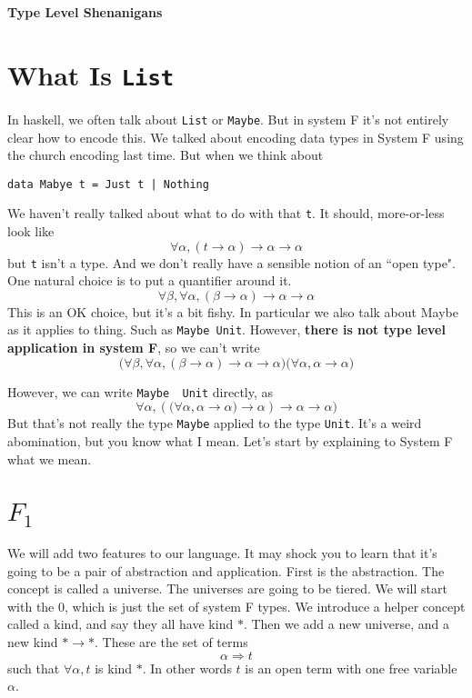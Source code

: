 \documentclass[12pt]{article}
\newcommand{\hask}{\texttt}
\begin{document}
\baselineskip 12pt

\begin{center}
\textbf{\Large Type Level Shenanigans} \\
\end{center}

\section{ What Is \hask{List}}

In haskell, we often talk about \hask{List} or \hask{Maybe}.
But in system F it's not entirely clear how to encode this.
We talked about encoding data types in System F using the church encoding last time.
But when we think about 
\begin{verbatim}
data Mabye t = Just t | Nothing
\end{verbatim}
We haven't really talked about what to do with that \hask{t}.
It should, more-or-less look like
\[
 \forall \alpha, (t \rightarrow \alpha) \rightarrow \alpha \rightarrow \alpha
\]
but \hask{t} isn't a type.
And we don't really have a sensible notion of an ``open type".
One natural choice is to put a quantifier around it.
\[
  \forall \beta, \forall \alpha, (\beta \rightarrow \alpha) \rightarrow \alpha \rightarrow \alpha
\]
This is an OK choice, but it's a bit fishy.
In particular we also talk about Maybe as it applies to thing. Such as \hask{Maybe Unit}.
However, \textbf{there is not type level application in system F}, so we can't write 
\[
  \big(\forall \beta, \forall \alpha, (\beta \rightarrow \alpha) \rightarrow \alpha \rightarrow \alpha\big) \big(\forall \alpha, \alpha \rightarrow \alpha\big)
\]

However, we can write \hask{Maybe\, Unit} directly, as 
\[
  \forall \alpha, (\big(\forall \alpha, \alpha \rightarrow \alpha\big) \rightarrow \alpha) \rightarrow \alpha \rightarrow \alpha\big)
\]
But that's not really the type \hask{Maybe} applied to the type \hask{Unit}.
It's a weird abomination, but you know what I mean.
Let's start by explaining to System F what we mean.

\section{$F_1$}

We will add two features to our language.
It may shock you to learn that it's going to be a pair of abstraction and application.
First is the abstraction. 
The concept is called a universe.
The universes are going to be tiered.
We will start with the 0, which is just the set of system F types.
We introduce a helper concept called a kind, and say they all have kind $*$. 
Then we add a new universe, and a new kind $* \rightarrow *$. 
These are the set of terms 
\[
  \alpha \Rightarrow t
\]
such that $\forall \alpha, t$ is kind $*$. 
In other words $t$ is an open term with one free variable $\alpha$.
\end{document}
